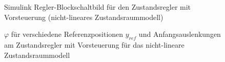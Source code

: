 \documentclass[
	pagesize,
	fontsize=12pt,
	paper=a4,
	oneside,
   reqno
]{scrartcl}
\begin{document}
\begin{figure}[H]
    \centering
    \caption[Regler mit Vorsteuerung Simulink (nicht-linear)]{Simulink Regler-Blockschaltbild für den Zustandsregler mit Vorsteuerung (nicht-lineares Zustandsraummodell)}
    \label{fig:Bild23.5}
\end{figure}

\begin{figure}[H]
    \centering
    \caption[$\varphi$ für Regler mit Vorsteuerung (nicht-linear)]{$\varphi$ für verschiedene Referenzpositionen $y_{ref}$ und Anfangsauslenkungen am Zustandsregler mit Vorsteuerung für das nicht-lineare Zustandsraummodell}
    \label{fig:Bild24}
\end{figure}
\end{document}
